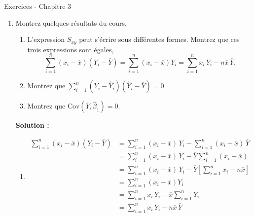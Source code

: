 \documentclass[letter, 11pt]{article}
\newcommand{\prof}[1]{\begin{professeur}\color{blue} {\bf Solution :} #1 \end{professeur}}
\begin{document}
\vspace*{0.01 cm}
\begin{center}
{\Large Exercices - Chapitre 3}
\end{center}




\begin{enumerate}[leftmargin=*, wide, label=\bf Exercice \arabic*:]

\item Montrez quelques résultats du cours.
\begin{enumerate}
    \item L'expression $S_{xy}$ peut s'écrire sous différentes formes. Montrez que ces trois expressions sont égales,
    $$\sum\limits_{i=1}^n \left(x_i-\overline x\right)\left(Y_i-\overline Y\right) = \sum\limits_{i=1}^n \left(x_i-\overline x\right)Y_i = \sum\limits_{i=1}^n x_i\,Y_i - n\overline x\,\overline Y.$$
    \item Montrez que $\sum\limits_{i=1}^n (Y_i-\widehat Y_i)(\widehat Y_i-\overline Y) = 0$.
    \item Montrez que $\text{Cov}(\overline Y,\widehat\beta_1)=0$.
    \end{enumerate}

\prof{\begin{enumerate}
\item $$\begin{array}{ll}
    \sum\limits_{i=1}^n (x_i-\overline x)(Y_i-\overline Y)
    &= \sum\limits_{i=1}^n (x_i-\overline x)\,Y_i-\sum\limits_{i=1}^n(x_i-\overline x)\,\overline Y\\[3mm]
    &= \sum\limits_{i=1}^n (x_i-\overline x)\,Y_i-\overline Y \sum\limits_{i=1}^n(x_i-\overline x)\,\\[3mm]
    &= \sum\limits_{i=1}^n (x_i-\overline x)\,Y_i-\overline Y \left[\sum\limits_{i=1}^n x_i-n\overline x\right]\,\\[3mm]
     &= \sum\limits_{i=1}^n (x_i-\overline x)Y_i \\[3mm]
     &= \sum\limits_{i=1}^n x_i\,Y_i-\overline x\sum\limits_{i=1}^n Y_i \\[3mm]
    &= \sum\limits_{i=1}^n x_i\,Y_i - n\overline x\,\overline Y\\
    \end{array}$$


\end{enumerate}}
\end{enumerate}
\end{document}
